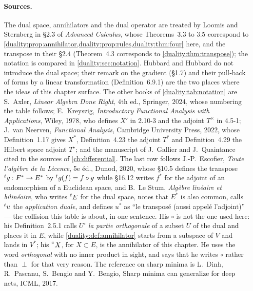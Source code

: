 \begin{notechapter}
\paragraph{Sources.} The dual space, annihilators and the dual operator
are treated by Loomis and Sternberg in \S2.3 of \emph{Advanced Calculus},
whose Theorems~3.3 to 3.5 correspond to
\cref{duality:prop:annihilator,duality:prop:rules,duality:thm:four} here,
and the transpose in their \S2.4 (Theorem~4.3 corresponds to
\cref{duality:thm:transpose}); the notation is compared in
\cref{duality:sec:notation}. Hubbard and Hubbard do not introduce the dual
space; their remark on the gradient (\S1.7) and their pull-back of forms
by a linear transformation (Definition~6.9.1) are the two places where the
ideas of this chapter surface. The other books of
\cref{duality:tab:notation} are S.~Axler, \emph{Linear Algebra Done
Right}, 4th ed., Springer, 2024, whose numbering the table follows;
E.~Kreyszig, \emph{Introductory Functional Analysis with
Applications}, Wiley, 1978, who defines $X'$ in 2.10-3 and the adjoint
$T^\times$ in 4.5-1; J.~van Neerven, \emph{Functional Analysis},
Cambridge University Press, 2022, whose Definition~1.17 gives $X^*$,
Definition~4.23 the adjoint $T^*$ and Definition~4.29 the Hilbert space
adjoint $T^\star$; and the manuscript of J.~Gallier and
J.~Quaintance cited in the sources of \cref{ch:differential}. The last
row follows J.-P.~Escofier, \emph{Toute l'alg\`ebre de la Licence},
5e \'ed., Dunod, 2020, whose \S10.5 defines the transpose
$\prescript{t}{}{g}:F^*\to E^*$ by $\prescript{t}{}{g}(f) = f\circ g$
while \S16.12 writes $f^*$ for the adjoint of an endomorphism of a
Euclidean space, and
B.~Le Stum, \emph{Alg\`ebre lin\'eaire et bilin\'eaire}, who writes
$\prescript{t}{}{E}$ for the dual space, notes that $E^*$ is also common,
calls $\prescript{t}{}{u}$ the \emph{application duale}, and defines
$u^*$ as ``le transpos\'e (aussi appel\'e l'adjoint)'' --- the collision
this table is about, in one sentence. His $\circ$ is not the one used
here: his Definition~2.5.1 calls $U^\circ$ \emph{la partie orthogonale}
of a subset $U$ of the dual and places it in $E$, while
\cref{duality:def:annihilator} starts from a subspace of $V$ and lands
in $V^*$; his $\prescript{\circ}{}{X}$, for $X\subset E$, is the
annihilator of this chapter. He uses the word \emph{orthogonal} with no
inner product in sight, and says that he writes $\circ$ rather than
$\perp$ for that very reason. The
reference on sharp minima is
L.~Dinh, R.~Pascanu, S.~Bengio and Y.~Bengio, Sharp minima can generalize
for deep nets, ICML, 2017.


\end{notechapter}
